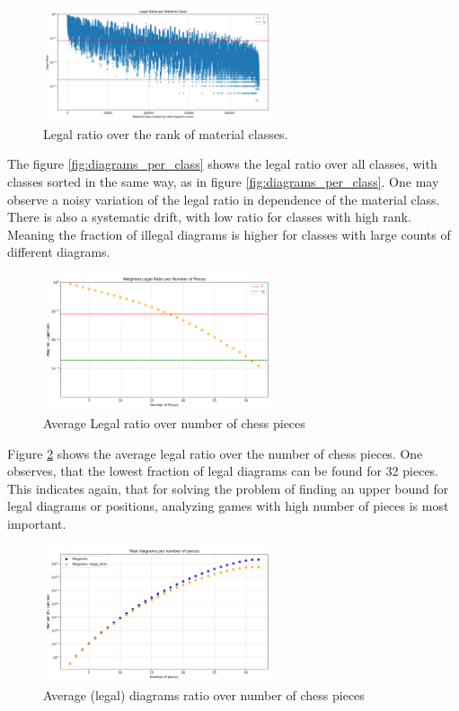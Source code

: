 \documentclass[12pt]{article}
\begin{document}
\begin{figure}[h!]
  \centering
  \includegraphics[width=0.6\textwidth]{valid_ratio_per_class.png}
  \caption{Legal ratio over the rank of material classes.}
  \label{fig:legal_ratio_by_class}
\end{figure}

The figure \ref{fig:diagrams_per_class} shows the legal ratio over all classes, with classes sorted in the same way, as in figure \ref{fig:diagrams_per_class}. One may observe a noisy variation of the legal ratio in dependence of the material class. There is also a systematic drift, with low ratio for classes with high rank. Meaning the fraction of illegal diagrams is higher for classes with large counts of different diagrams.


\begin{figure}[h!]
  \centering
  \includegraphics[width=0.6\textwidth]{valid_ratio_per_num_pieces.png}
  \caption{Average Legal ratio over number of chess pieces}
  \label{fig:legal_ratio_by_pieces}
\end{figure}
Figure \ref{fig:legal_ratio_by_pieces} shows the average legal ratio over the number of chess pieces. One observes, that the lowest fraction of legal diagrams can be found for 32 pieces. This indicates again, that for solving the problem of finding an upper bound for legal diagrams or positions, analyzing games with high number of pieces is most important.
\begin{figure}[h!]
  \centering
  \includegraphics[width=0.6\textwidth]{positions_per_num_pieces.png}
  \caption{Average (legal) diagrams ratio over number of chess pieces}
  \label{fig:diagrams_by_pieces}
\end{figure}
\end{document}
